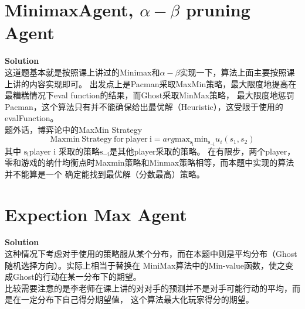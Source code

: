 \documentclass[a4paper]{article}
\begin{document}
\section{MinimaxAgent, $\alpha-\beta$ pruning Agent}
  	\textbf{Solution}\\
  	这道题基本就是按照课上讲过的Minimax和$\alpha-\beta$实现一下，算法上面主要按照课上讲的内容实现即可。
  	出发点上是Pacman采取MaxMin策略，最大限度地提高在最糟糕情况下eval function的结果，而Ghost采取MinMax策略，
  	最大限度地惩罚Pacman，这个算法只有并不能确保给出最优解（Heuristic），这受限于使用的
  	evalFunction。\\
  	题外话，博弈论中的MaxMin Strategy 
  	\begin{equation}
  		\mathrm{Maxmin\ Strategy\ for\ player\ i} = arg\mathrm{max_{s_i}min_{s_{-i}}}u_{i}(s_1, s_2)
  	\end{equation}
  	其中 $\mathrm{s_{i}}$player i 采取的策略$\mathrm{s_{-i}}$是其他player采取的策略。
  	在有限步，两个player，零和游戏的纳什均衡点时Maxmin策略和Minmax策略相等，而本题中实现的算法并不能算是一个
  	确定能找到最优解（分数最高）策略。
\clearpage
\section{Expection Max Agent}
  	\textbf{Solution}\\
  	这种情况下考虑对手使用的策略服从某个分布，而在本题中则是平均分布（Ghost随机选择方向）。实际上相当于替换在
  	MiniMax算法中的Min-value函数，使之变成Ghost的行动在某一分布下的期望。\\
  	比较需要注意的是李老师在课上讲的对对手的预测并不是对手可能行动的平均，而是在一定分布下自己得分期望值，
  	这个算法最大化玩家得分的期望。
\end{document}
